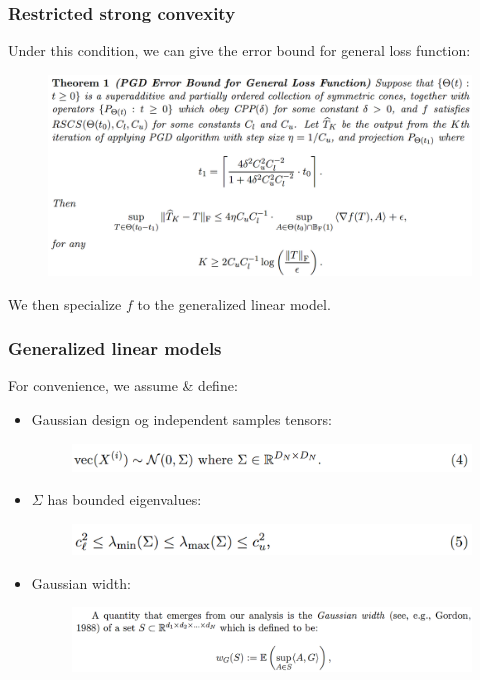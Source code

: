 \documentclass{beamer}
\begin{document}
	\begin{frame}
		\frametitle{Restricted strong convexity}
		Under this condition, we can give the error bound for general loss function:
		\begin{figure}
			\includegraphics[width=1\linewidth]{image016.png}
		\end{figure}
		We then specialize $f$ to the generalized linear model.
	\end{frame}
	
	\begin{frame}
		\frametitle{Generalized linear models}
		For convenience, we assume \& define:
		\begin{itemize}
			\item 
			Gaussian design og independent samples tensors:
			\begin{figure}
				\includegraphics[width=.8\linewidth]{image017.png}
			\end{figure}
			\item
			$\Sigma$ has bounded eigenvalues:
			\begin{figure}
				\includegraphics[width=.8\linewidth]{image018.png}
			\end{figure}
			\item
			Gaussian width:
			\begin{figure}
				\includegraphics[width=1\linewidth]{image019.png}
			\end{figure}
		\end{itemize}
	\end{frame}
	
\end{document}
